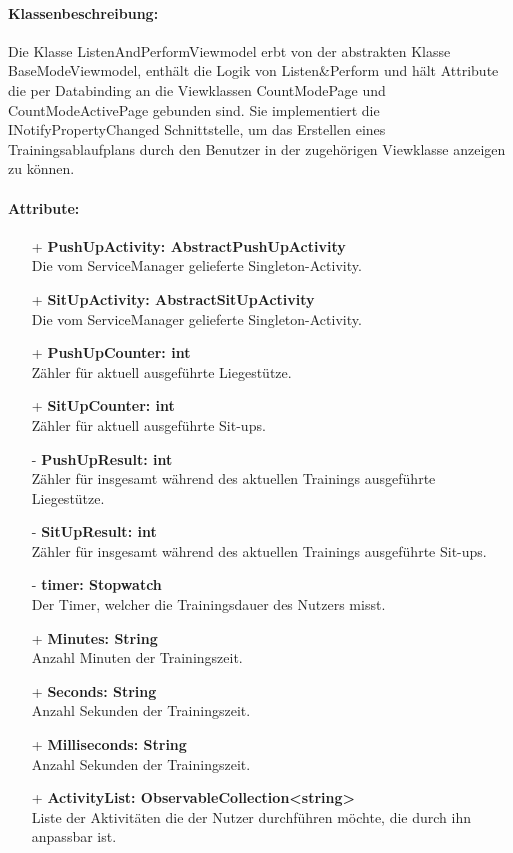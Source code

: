 \documentclass[a4paper,12pt]{article}
\begin{document}
\paragraph{Klassenbeschreibung:}
Die Klasse ListenAndPerformViewmodel erbt von der abstrakten Klasse BaseModeViewmodel, enthält die Logik von Listen\&Perform und hält Attribute die per Databinding an die Viewklassen CountModePage und CountModeActivePage gebunden sind.  Sie implementiert die INotifyPropertyChanged Schnittstelle, um das Erstellen eines Trainingsablaufplans durch den Benutzer in der zugehörigen Viewklasse anzeigen zu können.
\paragraph{Attribute:}
\begin{itemize}
	\item[+] \textbf{PushUpActivity: AbstractPushUpActivity} \\ Die vom ServiceManager gelieferte Singleton-Activity.
	\item[+] \textbf{SitUpActivity: AbstractSitUpActivity} \\ Die vom ServiceManager gelieferte Singleton-Activity.
	\item[+] \textbf{PushUpCounter: int} \\ Zähler für aktuell ausgeführte Liegestütze. 
	\item[+] \textbf{SitUpCounter: int} \\ Zähler für aktuell ausgeführte Sit-ups. 
	\item[-] \textbf{PushUpResult: int} \\ Zähler für insgesamt während des aktuellen Trainings ausgeführte Liegestütze. 
	\item[-] \textbf{SitUpResult: int} \\ Zähler für insgesamt während des aktuellen Trainings ausgeführte Sit-ups. 
	\item[-] \textbf{timer: Stopwatch} \\ Der Timer, welcher die Trainingsdauer des Nutzers misst. 
	\item[+] \textbf{Minutes: String} \\ Anzahl Minuten der Trainingszeit. 
	\item[+] \textbf{Seconds: String} \\  Anzahl Sekunden der Trainingszeit. 
	\item[+] \textbf{Milliseconds: String} \\ Anzahl Sekunden der Trainingszeit. 
	\item[+] \textbf{ActivityList: ObservableCollection<string>} \\ Liste der Aktivitäten die der Nutzer durchführen möchte, die durch ihn anpassbar ist. 

\end{itemize}
\end{document}

